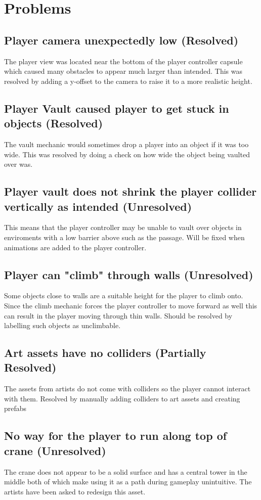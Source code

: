 \documentclass[a4paper,10pt]{article}
\begin{document}
\section{Problems}
\subsection{Player camera unexpectedly low (Resolved)}
The player view was located near the bottom of the player controller capsule which caused many obstacles to appear much larger than intended. This was resolved by adding a y-offset to the camera to raise it to a more realistic height.

\subsection{Player Vault caused player to get stuck in objects (Resolved)}
The vault mechanic would sometimes drop a player into an object if it was too wide. This was resolved by doing a check on how wide the object being vaulted over was.

\subsection{Player vault does not shrink the player collider vertically as intended (Unresolved)}
This means that the player controller may be unable to vault over objects in enviroments with a low barrier above such as the passage. Will be fixed when animations are added to the player controller.

\subsection{Player can "climb" through walls (Unresolved)}
Some objects close to walls are a suitable height for the player to climb onto. Since the climb mechanic forces the player controller to move forward as well this can result in the player moving through thin walls. Should be resolved by labelling such objects as unclimbable.

\subsection{Art assets have no colliders (Partially Resolved)}
The assets from artists do not come with colliders so the player cannot interact with them. Resolved by manually adding colliders to art assets and creating prefabs

\subsection{No way for the player to run along top of crane (Unresolved)}
The crane does not appear to be a solid surface and has a central tower in the middle both of which make using it as a path during gameplay unintuitive. The artists have been asked to redesign this asset.
\end{document}
